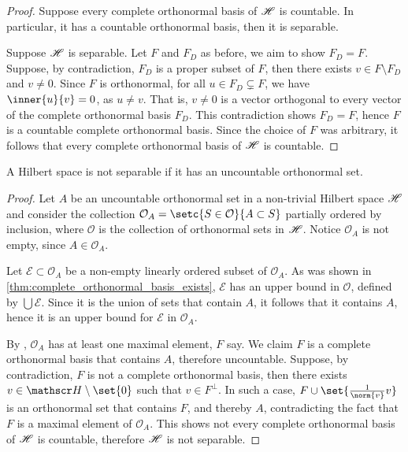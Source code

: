 \begin{proof}
    Suppose every complete orthonormal basis of \(\mathscr{H}\) is countable. In particular, it has a countable orthonormal basis, then it is separable.

    Suppose \(\mathscr{H}\) is separable. Let \(F\) and \(F_D\) as before, we aim to show \(F_D = F\). Suppose, by contradiction, \(F_D\) is a proper subset of \(F\), then there exists \(v \in F \setminus F_D\) and \(v \neq 0\). Since \(F\) is orthonormal, for all \(u \in F_D \subsetneq F\), we have \(\inner{u}{v} = 0\), as \(u \neq v\). That is, \(v\neq 0\) is a vector orthogonal to every vector of the complete orthonormal basis \(F_D\). This contradiction shows \(F_D = F\), hence \(F\) is a countable complete orthonormal basis. Since the choice of \(F\) was arbitrary, it follows that every complete orthonormal basis of \(\mathscr{H}\) is countable.
\end{proof}
\begin{corollary}
    A Hilbert space is not separable if it has an uncountable orthonormal set.
\end{corollary}
\begin{proof}
    Let \(A\) be an uncountable orthonormal set in a non-trivial Hilbert space \(\mathscr{H}\) and consider the collection \(\mathcal{O}_A = \setc{S \in \mathcal{O}}{A \subset S}\) partially ordered by inclusion, where \(\mathcal{O}\) is the collection of orthonormal sets in \(\mathscr{H}\). Notice \(\mathcal{O}_A\) is not empty, since \(A \in \mathcal{O}_A\).

    Let \(\mathcal{E} \subset \mathcal{O}_A\) be a non-empty linearly ordered subset of \(\mathcal{O}_A\). As was shown in \cref{thm:complete_orthonormal_basis_exists}, \(\mathcal{E}\) has an upper bound in \(\mathcal{O}\), defined by \(\bigcup \mathcal{E}\). Since it is the union of sets that contain \(A\), it follows that it contains \(A\), hence it is an upper bound for \(\mathcal{E}\) in \(\mathcal{O}_A\).

    By , \(\mathcal{O}_A\) has at least one maximal element, \(F\) say. We claim \(F\) is a complete orthonormal basis that contains \(A\), therefore uncountable. Suppose, by contradiction, \(F\) is not a complete orthonormal basis, then there exists \(v \in \hilbert \setminus \set{0}\) such that \(v \in F^\perp\). In such a case, \(F \cup \set{\frac{1}{\norm{v}}v}\) is an orthonormal set that contains \(F\), and thereby \(A\), contradicting the fact that \(F\) is a maximal element of \(\mathcal{O}_A\). This shows not every complete orthonormal basis of \(\mathscr{H}\) is countable, therefore \(\mathscr{H}\) is not separable.
\end{proof}

